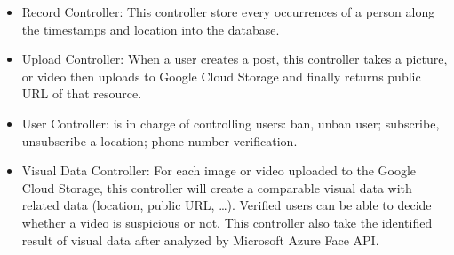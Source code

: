 \begin{itemize}
	\item Record Controller: This controller store every occurrences of a person along the timestamps and location into the database.
	\item Upload Controller: When a user creates a post, this controller takes a picture, or video then uploads to Google Cloud Storage and finally returns public URL of that resource.
	\item User Controller: is in charge of controlling users: ban, unban user; subscribe, unsubscribe a location; phone number verification.
	\item Visual Data Controller: For each image or video uploaded to the Google Cloud Storage, this controller will create a comparable visual data with related data (location, public URL, …). Verified users can be able to decide whether a video is suspicious or not. This controller also take the identified result of visual data after analyzed by Microsoft Azure Face API.    
\end{itemize}
